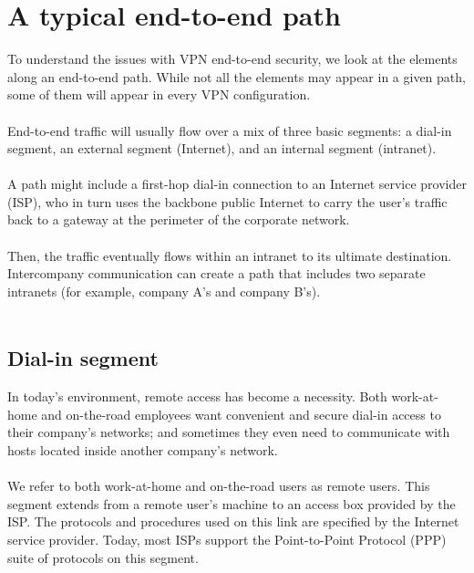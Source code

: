 \documentclass[10pt,a4paper]{article}
\begin{document}
\section{A typical end-to-end path}
To understand the issues with VPN end-to-end security, we look at the elements
along an end-to-end path. While not all the elements may appear in a given path,
some of them will appear in every VPN configuration. 
\\
\\
End-to-end traffic will
usually flow over a mix of three basic segments: a dial-in segment, an external
segment (Internet), and an internal segment (intranet).
\\
\\
A path might include a first-hop dial-in connection to an
Internet service provider (ISP), who in turn uses the backbone public Internet to
carry the user's traffic back to a gateway at the perimeter of the corporate
network. 
\\
\\
Then, the traffic eventually flows within an intranet to its ultimate
destination. Intercompany communication can create
a path that includes two separate intranets (for example, company A's and
company B's).
\\
\\
\subsection{Dial-in segment}
In today's environment, remote access has become a
necessity. Both work-at-home and on-the-road employees want convenient
and secure dial-in access to their company's networks; and sometimes they
even need to communicate with hosts located inside another company's
network. 
\\
\\
We refer to both work-at-home and on-the-road users as remote
users. This segment extends from a remote user's machine to an access box
provided by the ISP. The protocols and procedures used on this link are
specified by the Internet service provider. Today, most ISPs support the
Point-to-Point Protocol (PPP) suite of protocols on this segment.
\\
\\
\end{document}
